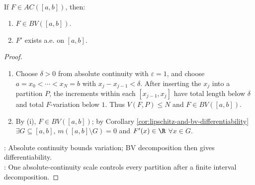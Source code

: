 \begin{corollary} \label{cor:absolute-continuity-bv-and-differentiability} \\
If $F\in AC([a,b])$, then:
\begin{enumerate}[label=(\roman*)]
\setlength{\itemsep}{0pt}
\item $F\in BV([a,b])$.
\item $F'$ exists a.e. on $[a,b]$.
\end{enumerate}
\begin{proof}
\begin{enumerate}[label=(\roman*)]
\setlength{\itemsep}{0pt}
\item Choose $\delta>0$ from absolute continuity with $\varepsilon=1$, and choose $a=x_0<\cdots<x_N=b$ with $x_j-x_{j-1}<\delta$. After inserting the $x_j$ into a partition $P$, the increments within each $[x_{j-1},x_j]$ have total length below $\delta$ and total $F$-variation below $1$. Thus $V(F,P)\leq N$ and $F\in BV([a,b])$.
\item By (i), $F\in BV([a,b])$; by Corollary \ref{cor:lipschitz-and-bv-differentiability} $\exists G\subseteq[a,b]$, $m([a,b]\setminus G)=0$ and $F'(x)\in\R$ $\forall x\in G$.
\end{enumerate}
: Absolute continuity bounds variation; BV decomposition then gives differentiability.\\
: One absolute-continuity scale controls every partition after a finite interval decomposition.
\end{proof}
\end{corollary}

